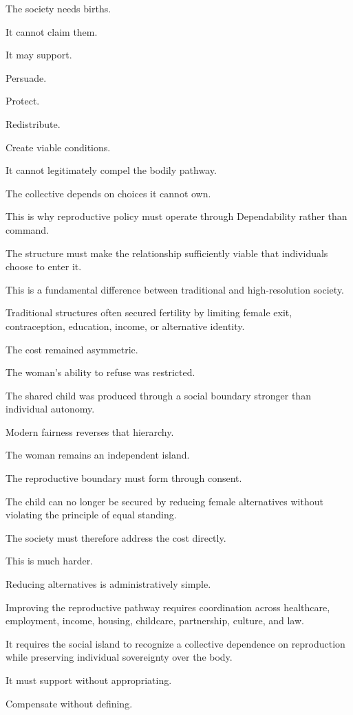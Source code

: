 The society needs births.

It cannot claim them.

It may support.

Persuade.

Protect.

Redistribute.

Create viable conditions.

It cannot legitimately compel the bodily pathway.

The collective depends on choices it cannot own.

This is why reproductive policy must operate through Dependability rather than command.

The structure must make the relationship sufficiently viable that individuals choose to enter it.

This is a fundamental difference between traditional and high-resolution society.

Traditional structures often secured fertility by limiting female exit, contraception, education, income, or alternative identity.

The cost remained asymmetric.

The woman’s ability to refuse was restricted.

The shared child was produced through a social boundary stronger than individual autonomy.

Modern fairness reverses that hierarchy.

The woman remains an independent island.

The reproductive boundary must form through consent.

The child can no longer be secured by reducing female alternatives without violating the principle of equal standing.

The society must therefore address the cost directly.

This is much harder.

Reducing alternatives is administratively simple.

Improving the reproductive pathway requires coordination across healthcare, employment, income, housing, childcare, partnership, culture, and law.

It requires the social island to recognize a collective dependence on reproduction while preserving individual sovereignty over the body.

It must support without appropriating.

Compensate without defining.

